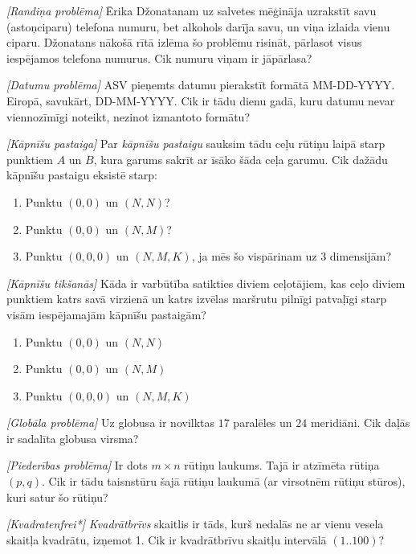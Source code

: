 \begin{problem}
\textit{[Randiņa problēma]}
Ērika Džonatanam uz salvetes mēģināja uzrakstīt savu (astoņciparu) telefona numuru, bet alkohols darīja savu, un viņa izlaida vienu ciparu. Džonatans nākošā rītā izlēma šo problēmu risināt, pārlasot visus iespējamos telefona numurus. Cik numuru viņam ir jāpārlasa?
\end{problem}
%

\begin{problem}
\textit{[Datumu problēma]}
ASV pieņemts datumu pierakstīt formātā MM-DD-YYYY. Eiropā, savukārt, DD-MM-YYYY. Cik ir tādu dienu gadā, kuru datumu nevar viennozīmīgi noteikt, nezinot izmantoto formātu?
\end{problem}

\begin{problem}
\textit{[Kāpnīšu pastaiga]}
Par \textit{kāpnīšu pastaigu} sauksim tādu ceļu rūtiņu laipā starp punktiem $A$ un $B$, kura garums sakrīt ar īsāko šāda ceļa garumu. Cik dažādu kāpnīšu pastaigu eksistē starp:

\begin{enumerate}
\item Punktu $(0,0)$ un $(N,N)$?
\item Punktu $(0,0)$ un $(N,M)$?
\item Punktu $(0,0,0)$ un $(N,M,K)$, ja mēs šo vispārinam uz 3 dimensijām?
\end{enumerate}
\end{problem}

\begin{problem}
\textit{[Kāpnīšu tikšanās]}
Kāda ir varbūtība satikties diviem ceļotājiem, kas ceļo diviem punktiem katrs savā virzienā un katrs izvēlas maršrutu pilnīgi patvaļīgi starp visām iespējamajām kāpnīšu pastaigām?
\begin{enumerate}
\item Punktu $(0,0)$ un $(N,N)$
\item Punktu $(0,0)$ un $(N,M)$
\item Punktu $(0,0,0)$ un $(N,M,K)$
\end{enumerate}
\end{problem}

\begin{problem}
\textit{[Globāla problēma]}
Uz globusa ir novilktas $17$ paralēles un $24$ meridiāni. Cik daļās ir sadalīta globusa virsma?
\end{problem}
%

\begin{problem}
\textit{[Piederības problēma]}
Ir dots $m \times n$ rūtiņu laukums. Tajā ir atzīmēta rūtiņa $(p,q)$. Cik ir tādu taisnstūru šajā rūtiņu laukumā (ar virsotnēm rūtiņu stūros), kuri satur šo rūtiņu?
\end{problem}
%

\begin{problem}
\textit{[Kvadratenfrei*]}
\textit{Kvadrātbrīvs} skaitlis ir tāds, kurš nedalās ne ar vienu vesela skaitļa kvadrātu, izņemot {1}. Cik ir kvadrātbrīvu skaitļu intervālā $(1..100)$?
\end{problem}
%

